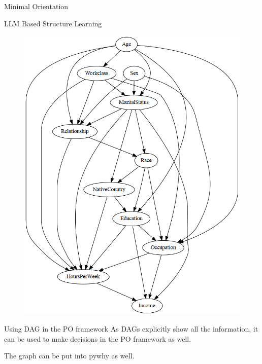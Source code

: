 \documentclass{beamer}
\begin{document}
\begin{frame}{Minimal Orientation}
\end{frame}

\begin{frame}{LLM Based Structure Learning}
	\begin{figure}
		\centering
		\includegraphics[scale=0.3]{imgs/adult_llm.png}
	\end{figure}
\end{frame}

\begin{frame}{Using DAG in the PO framework}
	As DAGs explicitly show all the information, it can be used to make
	decisions in the PO framework as well.

	The graph can be put into pywhy as well.
\end{frame}
\end{document}
